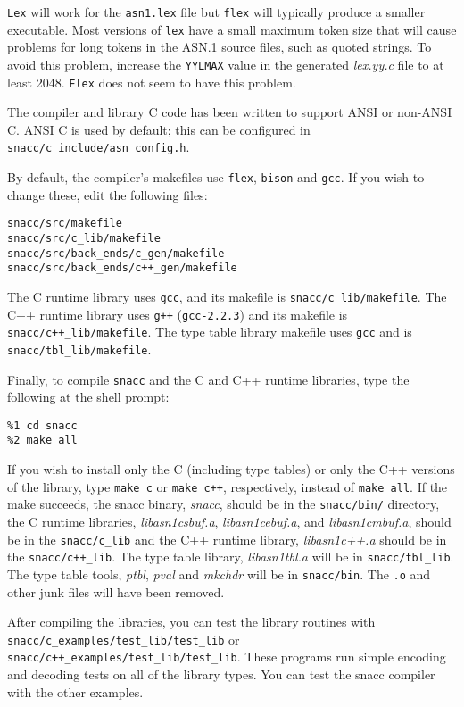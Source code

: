 \verb$Lex$ will work for the \verb$asn1.lex$ file but \verb$flex$ will typically
produce a smaller executable.  Most versions of \verb$lex$ have a small
maximum token size that will cause problems for long tokens in the
ASN.1 source files, such as quoted strings.  To avoid this problem,
increase the \verb$YYLMAX$ value in the generated {\em lex.yy.c} file to at least
2048.  \verb$Flex$ does not seem to have this problem.

The compiler and library C code has been written to support ANSI or
non-ANSI C\@.  ANSI C is used by default; this can be configured in
\verb$snacc/c_include/asn_config.h$.

By default, the compiler's makefiles use \verb$flex$, \verb$bison$ and
\verb$gcc$.  If you wish to change these, edit the following files:

\begin{verbatim}
snacc/src/makefile
snacc/src/c_lib/makefile
snacc/src/back_ends/c_gen/makefile
snacc/src/back_ends/c++_gen/makefile
\end{verbatim}

The C runtime library uses \verb$gcc$, and its makefile is
\verb$snacc/c_lib/makefile$.  The C++ runtime library uses \verb$g++$
(\verb$gcc-2.2.3$) and its makefile is \verb$snacc/c++_lib/makefile$.
The type table library makefile uses \verb$gcc$ and is
\verb$snacc/tbl_lib/makefile$.

Finally, to compile \verb$snacc$ and the C and C++ runtime libraries,
type the following at the shell prompt:

\begin{verbatim}
%1 cd snacc
%2 make all
\end{verbatim}

If you wish to install only the C (including type tables) or only the
C++ versions of the library, type \verb$make c$ or \verb$make c++$,
respectively, instead of \verb$make all$.  If the make succeeds, the
snacc binary, {\em snacc}, should be in the \verb$snacc/bin/$
directory, the C runtime libraries, {\em libasn1csbuf.a}, {\em
libasn1cebuf.a}, and {\em libasn1cmbuf.a}, should be in the
\verb$snacc/c_lib$ and the C++ runtime library, {\em libasn1c++.a}
should be in the \verb$snacc/c++_lib$.  The type table library, {\em
libasn1tbl.a} will be in \verb$snacc/tbl_lib$.  The type table tools,
{\em ptbl}, {\em pval} and {\em mkchdr} will be in \verb$snacc/bin$.
The \verb$.o$ and other junk files will have been removed.

After compiling the libraries, you can test the library routines with
\linebreak \verb$snacc/c_examples/test_lib/test_lib$ or \linebreak
\verb$snacc/c++_examples/test_lib/test_lib$.  These programs run
simple encoding and decoding tests on all of the library types.  You
can test the snacc compiler with the other examples.

